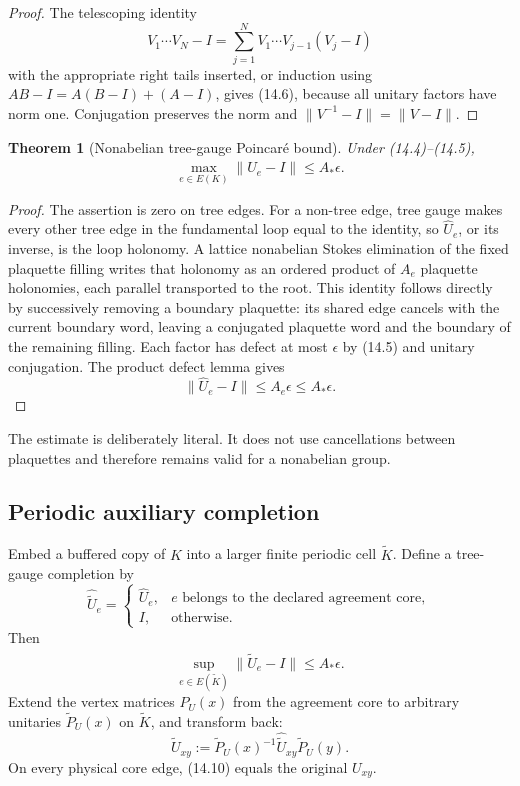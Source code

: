 \documentclass[11pt]{article}
\newtheorem{theorem}{Theorem}[section]
\begin{document}
\begin{proof}
The telescoping identity
\[
 V_1\cdots V_N-I
 =
 \sum_{j=1}^N
 V_1\cdots V_{j-1}(V_j-I)
\]
with the appropriate right tails inserted, or induction using
\(AB-I=A(B-I)+(A-I)\), gives (14.6), because all unitary factors have
norm one.  Conjugation preserves the norm and
\(\|V^{-1}-I\|=\|V-I\|\).
\end{proof}

\begin{theorem}[Nonabelian tree-gauge Poincar\'e bound]
\label{thm:v11v14-poincare}
Under (14.4)--(14.5),
\[
 \max_{e\in E(K)}\|\widehat U_e-I\|
 \leq A_*\epsilon.
 \tag{14.7}
\]
\end{theorem}

\begin{proof}
The assertion is zero on tree edges.  For a non-tree edge, tree gauge
makes every other tree edge in the fundamental loop equal to the identity,
so \(\widehat U_e\), or its inverse, is the loop holonomy.  A lattice
nonabelian Stokes elimination of the fixed plaquette filling writes that
holonomy as an ordered product of \(A_e\) plaquette holonomies, each
parallel transported to the root.  This identity follows directly by
successively removing a boundary plaquette: its shared edge cancels with
the current boundary word, leaving a conjugated plaquette word and the
boundary of the remaining filling.  Each factor has defect at most
\(\epsilon\) by (14.5) and unitary conjugation.  The product defect lemma
gives
\[
 \|\widehat U_e-I\|\leq A_e\epsilon\leq A_*\epsilon.
\]
\end{proof}

The estimate is deliberately literal.  It does not use cancellations
between plaquettes and therefore remains valid for a nonabelian group.

\subsection{Periodic auxiliary completion}

Embed a buffered copy of \(K\) into a larger finite periodic cell
\(\widetilde K\).  Define a tree-gauge completion by
\[
 \widehat{\widetilde U}_e=
 \begin{cases}
 \widehat U_e,&e\text{ belongs to the declared agreement core},\\
 I,&\text{otherwise}.
 \end{cases}
 \tag{14.8}
\]
Then
\[
 \sup_{e\in E(\widetilde K)}
 \|\widehat{\widetilde U}_e-I\|
 \leq A_*\epsilon.
 \tag{14.9}
\]
Extend the vertex matrices \(P_U(x)\) from the agreement core to arbitrary
unitaries \(\widetilde P_U(x)\) on \(\widetilde K\), and transform back:
\[
 \widetilde U_{xy}
 :=
 \widetilde P_U(x)^{-1}
 \widehat{\widetilde U}_{xy}
 \widetilde P_U(y).
 \tag{14.10}
\]
On every physical core edge, (14.10) equals the original \(U_{xy}\).
\end{document}
